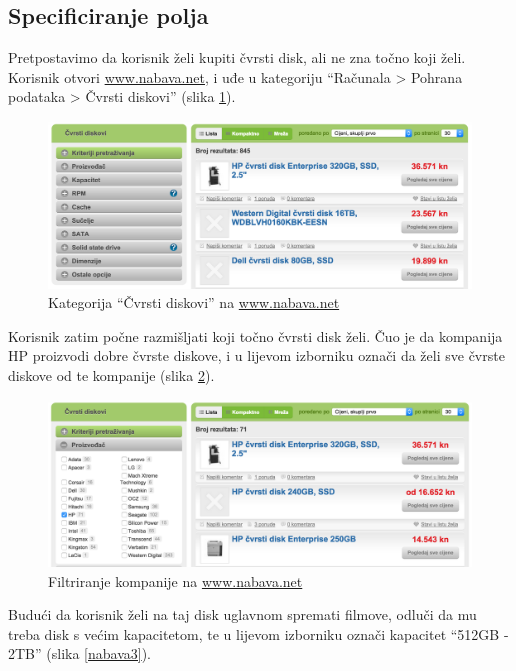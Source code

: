 \documentclass[a4paper,twoside,12pt]{scrreprt}
\begin{document}
\subsection{Specificiranje polja}

Pretpostavimo da korisnik želi kupiti čvrsti disk, ali ne zna točno koji želi. Korisnik otvori \url{www.nabava.net}, i uđe u kategoriju ``Računala > Pohrana podataka > Čvrsti diskovi'' (slika \ref{nabava1}).

\begin{figure}[H]
  \centering
  \includegraphics[width=\textwidth]{nabava1}
  \caption{Kategorija ``Čvrsti diskovi'' na \url{www.nabava.net}}
  \label{nabava1}
\end{figure}

Korisnik zatim počne razmišljati koji točno čvrsti disk želi. Čuo je da kompanija HP proizvodi dobre čvrste diskove, i u lijevom izborniku označi da želi sve čvrste diskove od te kompanije (slika \ref{nabava2}).

\begin{figure}[H]
  \centering
  \includegraphics[width=\textwidth]{nabava2}
  \caption{Filtriranje kompanije na \url{www.nabava.net}}
  \label{nabava2}
\end{figure}

Budući da korisnik želi na taj disk uglavnom spremati filmove, odluči da mu treba disk s većim kapacitetom, te u lijevom izborniku označi kapacitet ``512GB - 2TB'' (slika \ref{nabava3}).
\end{document}
